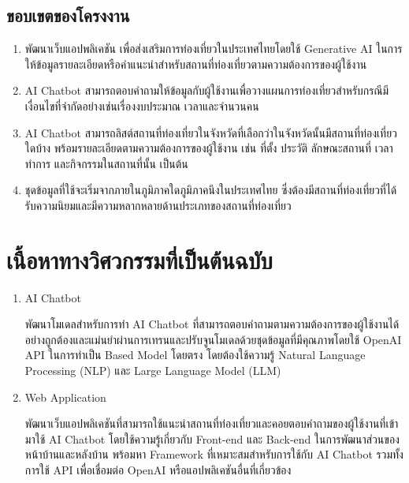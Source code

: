 \documentclass[12pt,oneside,openright,a4paper]{cpe-thai-project}
\begin{document}
\subsection{ขอบเขตของโครงงาน}
\begin{enumerate}
\item  พัฒนาเว็บแอปพลิเคชัน เพื่อส่งเสริมการท่องเที่ยวในประเทศไทยโดยใช้ Generative AI ในการให้ข้อมูลรายละเอียดหรือคำแนะนำสำหรับสถานที่ท่องเที่ยวตามความต้องการของผู้ใช้งาน
\item  AI Chatbot สามารถตอบคำถามให้ข้อมูลกับผู้ใช้งานเพื่อวางแผนการท่องเที่ยวสำหรับกรณีมีเงื่อนไขที่จำกัดอย่างเช่นเรื่องงบประมาณ เวลาและจำนวนคน
\item  AI Chatbot สามารถลิสต์สถานที่ท่องเที่ยวในจังหวัดที่เลือกว่าในจังหวัดนั้นมีสถานที่ท่องเที่ยวใดบ้าง พร้อมรายละเอียดตามความต้องการของผู้ใช้งาน เช่น ที่ตั้ง ประวัติ ลักษณะสถานที่ เวลาทำการ และกิจกรรมในสถานที่นั้น เป็นต้น
\item  ชุดข้อมูลที่ใช้จะเริ่มจากภายในภูมิภาคใดภูมิภาคนึงในประเทศไทย ซึ่งต้องมีสถานที่ท่องเที่ยวที่ได้รับความนิยมและมีความหลากหลายด้านประเภทของสถานที่ท่องเที่ยว
\end{enumerate}

\section{เนื้อหาทางวิศวกรรมที่เป็นต้นฉบับ}
\begin{enumerate}
\setlength{\parindent}{1cm}
\item  AI Chatbot

พัฒนาโมเดลสำหรับการทำ AI Chatbot ที่สามารถตอบคำถามตามความต้องการของผู้ใช้งานได้อย่างถูกต้องและแม่นยำผ่านการเทรนและปรับจูนโมเดลด้วยชุดข้อมูลที่มีคุณภาพโดยใช้ OpenAI API ในการทำเป็น Based Model โดยตรง โดยต้องใช้ความรู้ Natural Language Processing (NLP) และ Large Language Model (LLM)
\item  Web Application

พัฒนาเว็บแอปพลิเคชันที่สามารถใช้แนะนำสถานที่ท่องเที่ยวและคอยตอบคำถามของผู้ใช้งานที่เข้ามาใช้ AI Chatbot โดยใช้ความรู้เกี่ยวกับ Front-end และ Back-end ในการพัฒนาส่วนของหน้าบ้านและหลังบ้าน พร้อมหา Framework ที่เหมาะสมสำหรับการใช้กับ AI Chatbot รวมทั้งการใช้ API เพื่อเชื่อมต่อ OpenAI หรือแอปพลิเคชันอื่นที่เกี่ยวข้อง
\end{enumerate}

\end{document}
